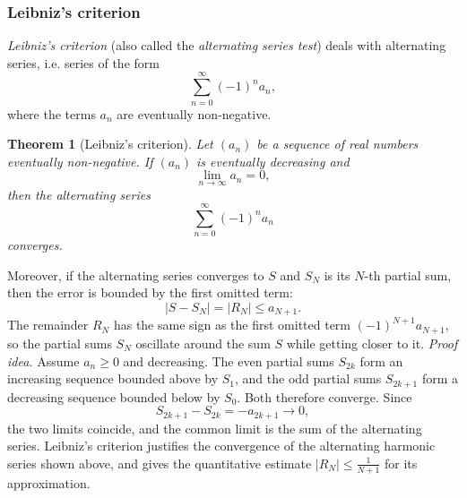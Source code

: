 \documentclass[11pt,a4paper]{article}
\theoremstyle{definition} \newtheorem{definition}{Definition} \theoremstyle{plain} \newtheorem{theorem}{Theorem}
\begin{document}
\subsubsection{Leibniz's criterion}
\emph{Leibniz's criterion} (also called the \emph{alternating series test}) deals with alternating series, i.e. series of the form
\[ \sum_{n=0}^{\infty} (-1)^n a_n, \]
where the terms $a_n$ are eventually non-negative.
\begin{theorem}[Leibniz's criterion]\label{thm:leibniz} Let $(a_n)$ be a sequence of real numbers eventually non-negative.
If $(a_n)$ is eventually decreasing and
\[ \lim_{n\to\infty} a_n = 0, \]
then the alternating series
\[ \sum_{n=0}^{\infty} (-1)^n a_n \]
converges. \end{theorem}
Moreover, if the alternating series converges to $S$ and $S_N$ is its $N$-th partial sum, then the error is bounded by the first omitted term:
\[ |S - S_N| = |R_N| \le a_{N+1}. \]
The remainder $R_N$ has the same sign as the first omitted term $(-1)^{N+1} a_{N+1}$, so the partial sums $S_N$ oscillate around the sum $S$ while getting closer to it.
\emph{Proof idea.}
Assume $a_n\ge 0$ and decreasing.
The even partial sums $S_{2k}$ form an increasing sequence bounded above by $S_1$, and the odd partial sums $S_{2k+1}$ form a decreasing sequence bounded below by $S_0$.
Both therefore converge.
Since
\[ S_{2k+1} - S_{2k} = -a_{2k+1} \to 0, \]
the two limits coincide, and the common limit is the sum of the alternating series.
Leibniz's criterion justifies the convergence of the alternating harmonic series shown above, and gives the quantitative estimate $|R_N|\le \frac{1}{N+1}$ for its approximation.
\end{document}

